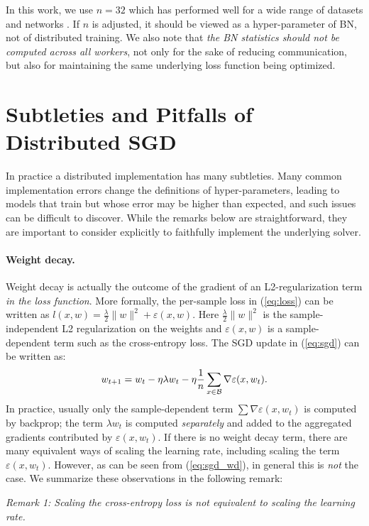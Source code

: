 \documentclass[10pt,twocolumn,letterpaper]{article}
\def\B{\mathcal{B}}
\newcommand{\eqntight}[2]{\vspace{-1mm}\begin{equation}\label{eq:#1}#2\vspace{-1mm}\end{equation}\ignorespaces}
\begin{document}
In this work, we use $n=32$ which has performed well for a wide range of datasets and networks \cite{Ioffe2015,He2016}. If $n$ is adjusted, it should be viewed as a hyper-parameter of BN, not of distributed training. We also note that \emph{the BN statistics should \emph{not} be computed across all workers}, not only for the sake of reducing communication, but also for maintaining the same underlying loss function being optimized.

\section{Subtleties and Pitfalls of Distributed SGD}\label{sec:remarks}

In practice a distributed implementation has many subtleties. Many common implementation errors change the definitions of hyper-parameters, leading to models that train but whose error may be higher than expected, and such issues can be difficult to discover. While the remarks below are straightforward, they are important to consider explicitly to faithfully implement the underlying solver.

\paragraph{Weight decay.} Weight decay is actually the outcome of the gradient of an L2-regularization term \emph{in the loss function}. More formally, the per-sample loss in (\ref{eq:loss}) can be written as $l(x,w) = \frac{\lambda}{2} \| w\|^2 + \varepsilon(x,w)$. Here $\frac{\lambda}{2} \| w\|^2$ is the sample-independent L2 regularization on the weights and $\varepsilon(x,w)$ is a sample-dependent term such as the cross-entropy loss. The SGD update in (\ref{eq:sgd}) can be written as:
 \eqntight{sgd_wd}{ w_{t+1} = w_{t} - \eta\lambda w_t - \eta \frac{1}{n}\sum_{x\in\B} \nabla \varepsilon(x,w_t). }
In practice, usually only the sample-dependent term $\sum \nabla \varepsilon(x,w_t)$ is computed by backprop; the term $\lambda w_t$ is computed \emph{separately} and added to the aggregated gradients contributed by $\varepsilon(x,w_t)$. If there is no weight decay term, there are many equivalent ways of scaling the learning rate, including scaling the term $\varepsilon(x,w_t)$. However, as can be seen from (\ref{eq:sgd_wd}), in general this is \emph{not} the case. We summarize these observations in the following remark:
\begin{center}\begin{minipage}{.75\linewidth}\centering
 \emph{Remark 1: Scaling the cross-entropy loss is \emph{not} equivalent to scaling the learning rate.}
\end{minipage}\end{center}
\end{document}
